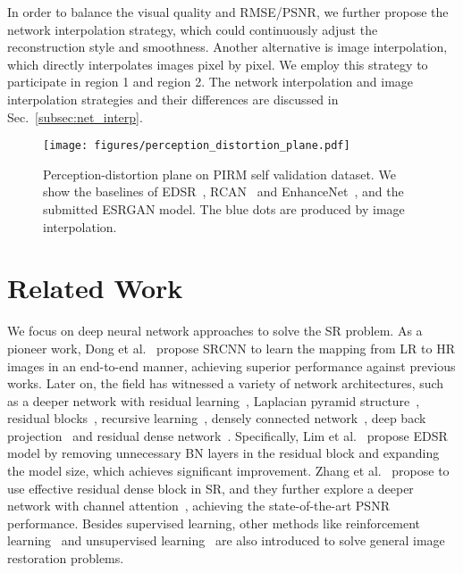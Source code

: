 \documentclass[runningheads]{llncs}
\begin{document}
In order to balance the visual quality and RMSE/PSNR, we further propose the network interpolation strategy, which 
could continuously adjust the reconstruction style and smoothness.
Another alternative is image interpolation, which directly interpolates images pixel by pixel. 
We employ this strategy to participate in region 1 and region 2. 
The network interpolation and image interpolation strategies and their differences are discussed in 
Sec.~\ref{subsec:net_interp}.

\begin{figure}[tbp]
	\begin{center}
\texttt{[image: figures/perception\_distortion\_plane.pdf]}
	\end{center}
	\vspace{-0.4cm}
	\caption{Perception-distortion plane on PIRM self validation dataset. We show the baselines of 
		EDSR~\cite{lim2017enhanced}, RCAN~\cite{zhang2018image} and EnhanceNet~\cite{sajjadi2017enhancenet}, and the 
		submitted ESRGAN model. The blue dots are produced by image interpolation.}
	\label{fig:perception_distortion_plane}
	\vspace{-0.4cm}
\end{figure}


\section{Related Work}
We focus on deep neural network approaches to solve the SR problem.
As a pioneer work, Dong et al.~\cite{dong2014learning,dong2016image} propose SRCNN to learn the mapping from LR to HR 
images in an end-to-end manner, achieving superior performance against previous works.
Later on, the field has witnessed a variety of network architectures, such as a deeper network with residual
learning~\cite{kim2016accurate}, Laplacian pyramid structure~\cite{lai2017deep}, residual blocks~\cite{ledig2017photo},
recursive learning~\cite{kim2016deeply,tai2017image}, densely connected network~\cite{tai2017memnet}, deep back
projection~\cite{haris2018deep} and residual dense network~\cite{zhang2018residual}.
Specifically, Lim et al.~\cite{lim2017enhanced} propose EDSR model by removing unnecessary BN layers in the residual 
block and expanding the model size, which achieves significant improvement.
Zhang et al.~\cite{zhang2018residual} propose to use effective residual dense block in SR, and they further explore a 
deeper network with channel attention~\cite{zhang2018image}, achieving the state-of-the-art PSNR performance.
Besides supervised learning, other methods like reinforcement learning~\cite{yu2018crafting} and unsupervised 
learning~\cite{yuan2018unsupervised} are also introduced to solve general image restoration problems.
\end{document}
